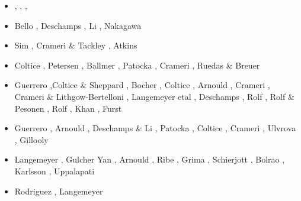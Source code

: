\begin{itemize}
\begin{scriptsize}
\begin{itemize}
                            \cite{nata13}\cite{mowe13},
\item[\twothousandfourteen] \cite{yadl14}\cite{crta14},
                            \cite{roct14}\cite{cort14},
                            \cite{becr14}\cite{lidt14},
                            \cite{robg14}\cite{nata14}
\item[\twothousandfifteen] Bello \etal \cite{bect15}, Deschamps \etal \cite{delt15},
                           Li \etal \cite{lidt15}, Nakagawa \etal \cite{nani15}
\item[\twothousandsixteen] Sim \etal \cite{sisc16}, Crameri \& Tackley \cite{crta16}, 
                           Atkins \etal \cite{atvt16}
\item[\twothousandseventeen] Coltice \etal \cite{cogu17}, Petersen \etal \cite{pest17}, 
                             Ballmer \etal \cite{bahh17}, Patocka \etal \cite{pact17}, 
                             Crameri \etal \cite{crlt17}, Ruedas \& Breuer \cite{rubr17} 
\item[\twothousandeighteen] Guerrero \etal \cite{guld18},Coltice \& Sheppard \cite{cosh18}, 
                            Bocher \etal \cite{bofc18}, Coltice \etal \cite{cold18}, 
                            Arnould \etal \cite{arcf18}, Crameri \cite{cram18}, 
                            Crameri \& Lithgow-Bertelloni \cite{crli18}, Langemeyer etal \cite{lalt18}, 
                            Deschamps \etal \cite{dert18}, Rolf \etal \cite{ross18},
                            Rolf \& Pesonen \cite{rope18}, Rolf \etal \cite{roct18},
                            Khan \etal \cite{khlr18}, Furst \etal \cite{fupc18}
\item[\twothousandnineteen] Guerrero \etal \cite{gult19}, Arnould \etal \cite{argc19},
                            Deschamps \& Li \cite{deli19}, Patocka \etal \cite{pact19},
                            Coltice \etal \cite{cohf19}, Crameri \etal \cite{crcm19},
                            Ulvrova \etal \cite{ulcw19}, Gillooly \etal \cite{gicw19}
\item[\twothousandtwenty] Langemeyer \etal \cite{lalt20}, Gulcher \etal \cite{gugb20}
                          Yan \etal \cite{yabt20}, Arnould \etal \cite{arcf20}, 
                          Ribe \etal \cite{rits20}, Grima \etal \cite{grlc20}, 
                          Schierjott \etal \cite{scrt20}, 
                          Bolrao \etal \cite{bobm20}, Karlsson \etal \cite{kacc20},
                          Uppalapati \etal \cite{uprc20}
\item[\twothousandtwentyone] Rodriguez \etal \cite{roac21}, Langemeyer \etal \cite{lalt21}
\end{itemize}
\end{scriptsize}


\end{itemize}
